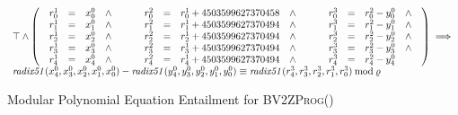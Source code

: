 \begin{figure*}
  \centering
  \[
  \begin{array}{l}
  \top \wedge
  \left(
  \begin{array}{lclcl}
    \begin{array}{rclc}
      {r}^1_0 & = & {x}^0_0 & \wedge \\
      {r}^1_1 & = & {x}^0_1 & \wedge \\
      {r}^1_2 & = & {x}^0_2 & \wedge \\
      {r}^1_3 & = & {x}^0_3 & \wedge \\
      {r}^1_4 & = & {x}^0_4 & \wedge \\
    \end{array}
    &\hspace{.01\textwidth}&
    \begin{array}{rclc}
      {r}^2_0 & = & {r}^1_0 + {4503599627370458} & \wedge \\
      {r}^2_1 & = & {r}^1_1 + {4503599627370494} & \wedge \\
      {r}^2_2 & = & {r}^1_2 + {4503599627370494} & \wedge \\
      {r}^2_3 & = & {r}^1_3 + {4503599627370494} & \wedge \\
      {r}^2_4 & = & {r}^1_4 + {4503599627370494} & \wedge\\
    \end{array}
    &\hspace{.01\textwidth}&
    \begin{array}{rclc}
      {r}^3_0 & = & {r}^2_0 - {y}^0_0 & \wedge \\
      {r}^3_1 & = & {r}^2_1 - {y}^0_1 & \wedge \\
      {r}^3_2 & = & {r}^2_2 - {y}^0_2 & \wedge \\
      {r}^3_3 & = & {r}^2_3 - {y}^0_3 & \wedge \\
      {r}^3_4 & = & {r}^2_4 - {y}^0_4
    \end{array}
  \end{array}
  \right) \implies \\
    \mathit{radix51}({x}^0_4, {x}^0_3, {x}^0_2, {x}^0_1, {x}^0_0) -
    \mathit{radix51}({y}^0_4, {y}^0_3, {y}^0_2, {y}^0_1, {y}^0_0)
    \equiv
    \mathit{radix51}({r}^3_4, {r}^3_3, {r}^3_2, {r}^3_1, {r}^3_0)
    \mod \myprime
  \end{array}
  \]
  \caption{Modular Polynomial Equation Entailment for \textsc{BV2ZProg}()}
  \label{figure:translation:subtraction-polynomial}
\end{figure*}

